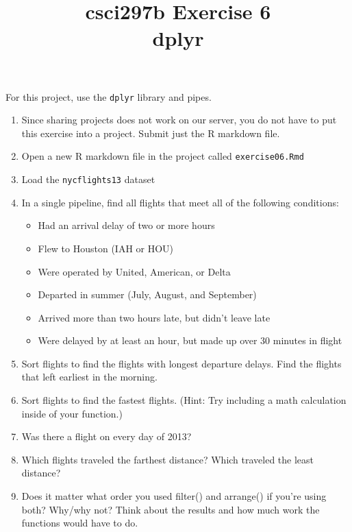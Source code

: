 \documentclass[12pt]{article}
\title{csci297b Exercise 6\\dplyr
  }
\date{}
\newcommand{\bi}{\begin{itemize}}
\newcommand{\ei}{\end{itemize}}
\newcommand{\li}{\item}
\begin{document}
\maketitle

For this project, use the {\tt dplyr} library and pipes.

\begin{enumerate}

\item Since sharing projects does not work
on our server, you do not have to put this exercise into a project.
Submit just the R markdown file.


\item Open a new R markdown file in the project called \verb|exercise06.Rmd|

\item Load the {\tt nycflights13} dataset

\item
In a single pipeline, find all flights that meet all of the following conditions:

\bi
\li
Had an arrival delay of two or more hours
\li
Flew to Houston (IAH or HOU)
\li
Were operated by United, American, or Delta
\li
Departed in summer (July, August, and September)
\li
Arrived more than two hours late, but didn’t leave late
\li
Were delayed by at least an hour, but made up over 30 minutes in flight
\ei
\item
Sort flights to find the flights with longest departure delays. Find the flights that left earliest in the morning.
\item
Sort flights to find the fastest flights. (Hint: Try including a math calculation inside of your function.)
\item
Was there a flight on every day of 2013?
\item
Which flights traveled the farthest distance? Which traveled the least distance?
\item
Does it matter what order you used filter() and arrange() if you’re using both? Why/why not? Think about the results and how much work the functions would have to do.

\end{enumerate}
\end{document}
